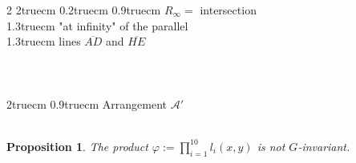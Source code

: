 \documentclass[12pt]{amsart}
\newtheorem{proposition}[theorem]{Proposition}
\theoremstyle{definition}
\numberwithin{equation}{section}
\begin{document}
\begin{multicols}{2}
\hglue 2truecm 
\vglue0.2truecm
\hglue 0.9truecm 
$R_\infty =$ intersection \\  \hglue 1.3truecm "at infinity" of the parallel \\
\hglue 1.3truecm  
lines $\overline{AD}$ and $\overline{HE}$\\ \\ \\ \\ 
\vglue2truecm
\hglue 0.9truecm  Arrangement {$\mathcal A' $} \\
\\ 
\end{multicols}



\begin{proposition}
The product $\varphi:=\prod_{i=1}^{10} l_i(x,y)$ is not $G$-invariant.  
\end{proposition}
\end{document}
